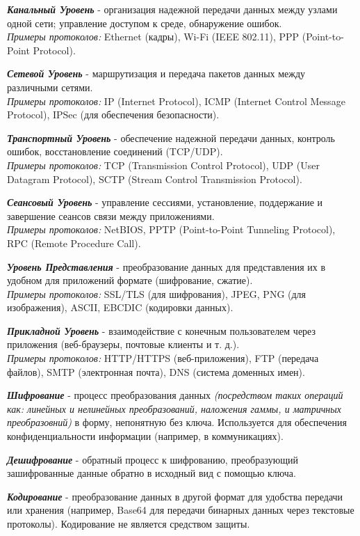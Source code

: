 \documentclass[utf8,14pt,a4paper,oneside,russian]{book}
\begin{document}
\textbf{\textit{Канальный Уровень}} - организация надежной передачи данных между узлами одной сети; управление доступом к среде,
обнаружение ошибок.\\
\textit{Примеры протоколов:} Ethernet (кадры), Wi-Fi (IEEE 802.11), PPP (Point-to-Point Protocol).

\textbf{\textit{Сетевой Уровень}} - маршрутизация и передача пакетов данных между различными сетями.\\
\textit{Примеры протоколов:} IP (Internet Protocol), ICMP (Internet Control Message Protocol), IPSec (для обеспечения безопасности).

\textbf{\textit{Транспортный Уровень}} - обеспечение надежной передачи данных, контроль ошибок, восстановление соединений (TCP/UDP).\\
\textit{Примеры протоколов:} TCP (Transmission Control Protocol), UDP (User Datagram Protocol), SCTP (Stream Control Transmission Protocol).

\textbf{\textit{Сеансовый Уровень}} - управление сессиями, установление, поддержание и завершение сеансов связи между приложениями.\\
\textit{Примеры протоколов:} NetBIOS, PPTP (Point-to-Point Tunneling Protocol), RPC (Remote Procedure Call).

\textbf{\textit{Уровень Представления}} - преобразование данных для представления их в удобном для приложений формате (шифрование, сжатие).\\
\textit{Примеры протоколов:} SSL/TLS (для шифрования), JPEG, PNG (для изображения), ASCII, EBCDIC (кодировки данных).

\textbf{\textit{Прикладной Уровень}} - взаимодействие с конечным пользователем через приложения (веб-браузеры, почтовые клиенты и т. д.).\\
\textit{Примеры протоколов:} HTTP/HTTPS (веб-приложения), FTP (передача файлов), SMTP (электронная почта), DNS (система доменных имен).

\textbf{\textit{Шифрование}} - процесс преобразования данных \textit{(посредством таких операций как: линейных и нелинейных преобразований,
    наложения гаммы, и матричных преобразовний)} в форму, непонятную без ключа. Используется для обеспечения конфиденциальности
информации (например, в коммуникациях).

\textbf{\textit{Дешифрование}} - обратный процесс к шифрованию, преобразующий зашифрованные данные обратно в исходный вид с помощью ключа.

\textbf{\textit{Кодирование}} - преобразование данных в другой формат для удобства передачи или хранения (например, Base64 для передачи
бинарных данных через текстовые протоколы). Кодирование не является средством защиты.
\end{document}
